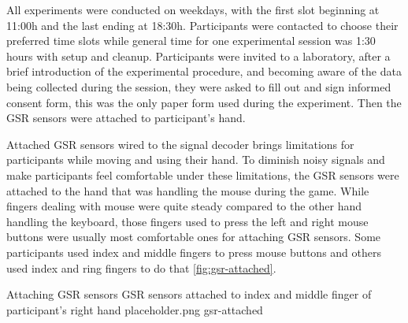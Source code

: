 \documentclass{uofsthesis-cs}
\begin{document}
All experiments were conducted on weekdays, with the first slot beginning at 11:00h and the last ending at 18:30h. Participants were contacted to choose their preferred time slots while general time for one experimental session was 1:30 hours with setup and cleanup. Participants were invited to a laboratory, after a brief introduction of the experimental procedure, and becoming aware of the data being collected during the session, they were asked to fill out and sign informed consent form, this was the only paper form used during the experiment. Then the GSR sensors were attached to participant's hand.

Attached GSR sensors wired to the signal decoder brings limitations for participants while moving and using their hand. To diminish noisy signals and make participants feel comfortable under these limitations, the GSR sensors were attached to the hand that was handling the mouse during the game. While fingers dealing with mouse were quite steady compared to the other hand handling the keyboard, those fingers used to press the left and right mouse buttons were usually most comfortable ones for attaching GSR sensors. Some participants used index and middle fingers to press mouse buttons and others used index and ring fingers to do that \ref{fig:gsr-attached}.

\img
{Attaching GSR sensors}
{GSR sensors attached to index and middle finger of participant's right hand}
{placeholder.png}
{gsr-attached}
\end{document}
